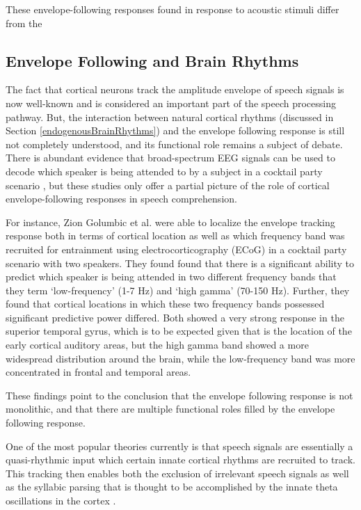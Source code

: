 \documentclass[titlepage]{article}
\begin{document}
    These envelope-following responses found in response to acoustic stimuli
    differ from the

  \subsection{Envelope Following and Brain Rhythms}

    The fact that cortical neurons track the amplitude envelope of speech
    signals is now well-known and is considered an important part of the speech
    processing pathway. But, the interaction between natural cortical rhythms
    (discussed in Section \ref{endogenousBrainRhythms}) and the envelope following
    response is still not completely understood, and its functional role remains
     a subject of debate. There is abundant evidence that broad-spectrum EEG
     signals can be used to decode which speaker is being attended to by a
     subject in a cocktail party scenario \cite{Horton2014,DeTaillez2018}, but
     these studies only offer a partial picture of the role of cortical
     envelope-following responses in speech comprehension.

    For instance, Zion Golumbic et al. \cite{ZionGolumbic2013} were able to
    localize the envelope tracking response both in terms of cortical location
    as well as which frequency band was recruited for entrainment using
    electrocorticography (ECoG) in a cocktail party scenario with two speakers.
    They found found that there is a significant ability to predict which
    speaker is being attended in two different frequency bands that they term
    `low-frequency' (1-7 Hz) and `high gamma' (70-150 Hz). Further, they found
    that cortical locations in which these two frequency bands possessed
    significant predictive power differed. Both showed a very strong response
    in the superior temporal gyrus, which is to be expected given that is the
    location of the early cortical auditory areas, but the high gamma band
    showed a more widespread distribution around the brain, while the
    low-frequency band was more concentrated in frontal and temporal areas.

    These findings point to the conclusion that the envelope following response
    is not monolithic, and that there are multiple functional roles filled by
    the envelope following response.

    One of the most popular theories currently is that speech signals are
    essentially a quasi-rhythmic input which certain innate cortical rhythms are
    recruited to track. This tracking then enables both the exclusion of
    irrelevant speech signals \cite{Horton2014,OSullivan2015} as well as the
    syllabic parsing that is thought to be accomplished by the innate theta
    oscillations in the cortex \cite{Doelling2014,Ghitza2013b}.
\end{document}

